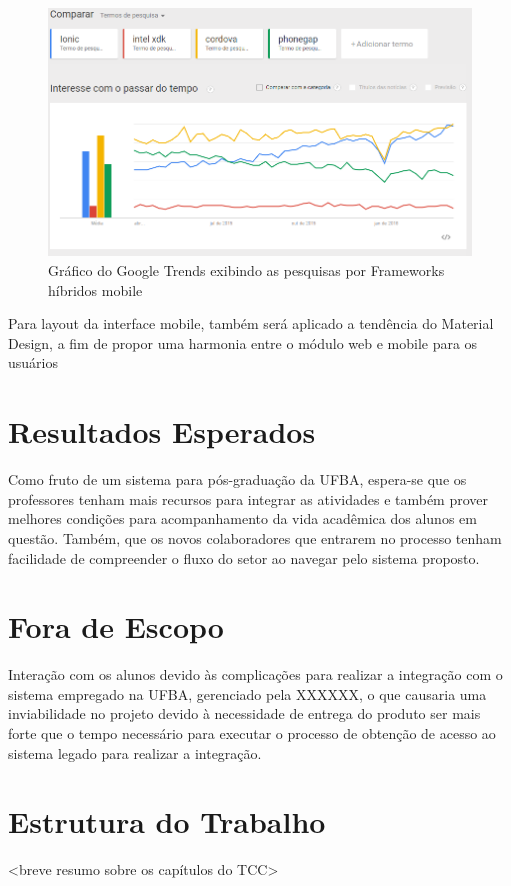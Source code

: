 \begin{figure}
	\label{fig:graficoGoogleTrendsFerramentasHibridasMobile}
	\includegraphics[width=1\textwidth]{img/grafico_ferramentas_hibridas_mobile}
	\caption{Gráfico do Google Trends exibindo as pesquisas por Frameworks híbridos mobile}
\end{figure}	

Para layout da interface mobile, também será aplicado a tendência do Material Design, a fim de propor uma harmonia entre o módulo web e mobile para os usuários


\section{Resultados Esperados}


Como fruto de um sistema para pós-graduação da UFBA, espera-se que os professores tenham mais recursos para integrar as atividades e também prover melhores condições para acompanhamento da vida acadêmica dos alunos em questão. Também, que os novos colaboradores que entrarem no processo tenham facilidade de compreender o fluxo do setor ao navegar pelo sistema proposto.


\section{Fora de Escopo}


Interação com os alunos devido às complicações para realizar a integração com o sistema empregado na UFBA, gerenciado pela XXXXXX, o que causaria uma inviabilidade no projeto devido à necessidade de entrega do produto ser mais forte que o tempo necessário para executar o processo de obtenção de acesso ao sistema legado para realizar a integração.


\section{Estrutura do Trabalho}


<breve resumo sobre os capítulos do TCC>